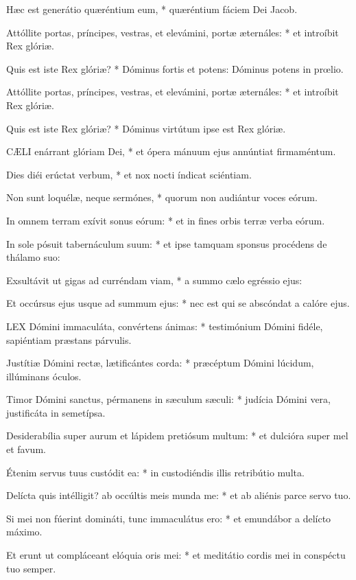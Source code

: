 Hæc est generátio quæréntium eum, * quæréntium fáciem Dei Jacob.

Attóllite portas, príncipes, vestras, et elevámini, portæ æternáles: * et introíbit Rex glóriæ.

Quis est iste Rex glóriæ? * Dóminus fortis et potens: Dóminus potens in prœlio.

Attóllite portas, príncipes, vestras, et elevámini, portæ æternáles: * et introíbit Rex glóriæ.

Quis est iste Rex glóriæ? * Dóminus virtútum ipse est Rex glóriæ.


\lettrine[lines=2]{C}{ÆLI} enárrant glóriam Dei, * et ópera mánuum ejus annúntiat firmaméntum.

Dies diéi erúctat verbum, * et nox nocti índicat sciéntiam.

Non sunt loquélæ, neque sermónes, * quorum non audiántur voces eórum.

In omnem terram exívit sonus eórum: * et in fines orbis terræ verba eórum.

In sole pósuit tabernáculum suum: * et ipse tamquam sponsus procédens de thálamo suo:

Exsultávit ut gigas ad curréndam viam, * a summo cælo egréssio ejus:

Et occúrsus ejus usque ad summum ejus: * nec est qui se abscóndat a calóre ejus.


\lettrine[lines=2]{L}{EX} Dómini immaculáta, convértens ánimas: * testimónium Dómini fidéle, sapiéntiam præstans párvulis.

Justítiæ Dómini rectæ, lætificántes corda: * præcéptum Dómini lúcidum, illúminans óculos.

Timor Dómini sanctus, pérmanens in sæculum sæculi: * judícia Dómini vera, justificáta in semetípsa.

Desiderabília super aurum et lápidem pretiósum multum: * et dulcióra super mel et favum.

Étenim servus tuus custódit ea: * in custodiéndis illis retribútio multa.

Delícta quis intélligit? ab occúltis meis munda me: * et ab aliénis parce servo tuo.

Si mei non fúerint domináti, tunc immaculátus ero: * et emundábor a delícto máximo.

Et erunt ut compláceant elóquia oris mei: * et meditátio cordis mei in conspéctu tuo semper.

